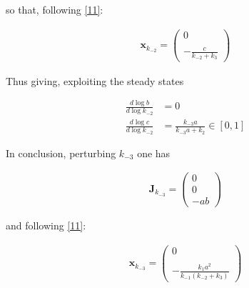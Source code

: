 \documentclass{article}
\begin{document}
	so that, following \eqref{11}:
	
	\begin{center}
		\begin{equation}
			\begin{aligned}
				\mathbf{x}_{k_{-2}}= \begin{pmatrix}
					0 \\ \\
					-\frac{c}{k_{-2}+k_3}
				\end{pmatrix}
				\label{106}
			\end{aligned}
		\end{equation}
	\end{center}
	
	
	Thus giving, exploiting the steady states
	
	\begin{center}
		\begin{equation}
			\begin{aligned}
				\frac{d \log b}{d \log k_{-2}} &= 0 \\
				\frac{d \log c}{d \log k_{-2}} &= \frac{k_{-3} a }{k_{-3} a + k_2} \in \left[0,1 \right]
			\end{aligned}
		\end{equation}
	\end{center}
	
	In conclusion, perturbing $k_{-3}$ one has
	
	\begin{center}
		\begin{equation}
			\begin{aligned}
				\mathbf{J}_{k_{-3}}= \begin{pmatrix}
					0\\
					0\\
					- a b
				\end{pmatrix}
				\label{108}
			\end{aligned}
		\end{equation}
	\end{center}
	
	and following \eqref{11}:
	
	\begin{center}
		\begin{equation}
			\begin{aligned}
				\mathbf{x}_{k_{-3}}= \begin{pmatrix}
					0 \\ \\
					-\frac{k_{1}a^2}{k_{-1}(k_{-2}+k_3)}
				\end{pmatrix}
				\label{100}
			\end{aligned}
		\end{equation}
	\end{center}
	
\end{document}
